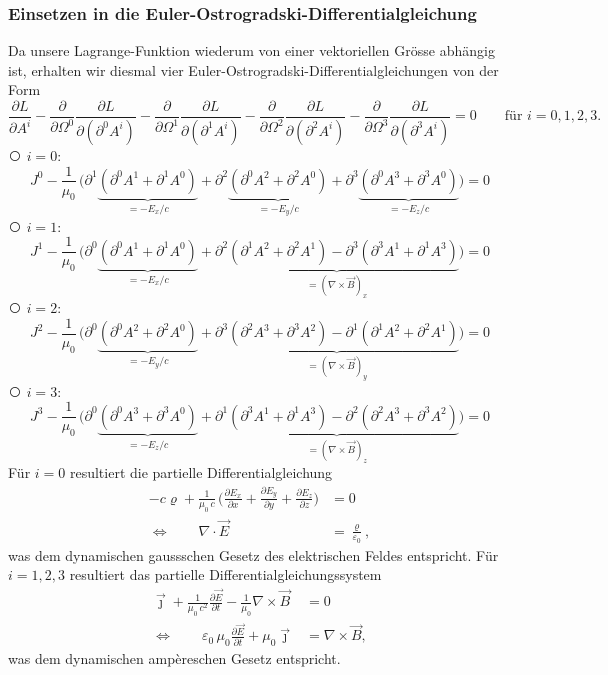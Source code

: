 \subsubsection{Einsetzen in die Euler-Ostrogradski-Differentialgleichung}
Da unsere Lagrange-Funktion wiederum von einer vektoriellen Grösse abhängig ist, erhalten wir diesmal vier Euler-Ostrogradski-Differentialgleichungen von der Form
\[
\frac{\partial L}{\partial A^i} 
- \frac{\partial}{\partial \Omega^0}\frac{\partial L}{\partial(\partial^0 A^i)}
- \frac{\partial}{\partial \Omega^1}\frac{\partial L}{\partial(\partial^1 A^i)}
- \frac{\partial}{\partial \Omega^2}\frac{\partial L}{\partial(\partial^2 A^i)}
- \frac{\partial}{\partial \Omega^3}\frac{\partial L}{\partial(\partial^3 A^i)}
= 0 \qquad \text{für } i=0,1,2,3.
\]
{\larger\textcircled{}} $i = 0$:
\[
J^0  -\frac{1}{\mu_0}\,\biggl(\partial^1\underbrace{\left(\partial^0 A^1 + \partial^1 A^0\right)}_{\displaystyle=-E_x/c}
+ \partial^2\underbrace{\left(\partial^0 A^2 + \partial^2 A^0\right)}_{\displaystyle=-E_y/c}
+ \partial^3\underbrace{\left(\partial^0 A^3 + \partial^3 A^0\right)}_{\displaystyle=-E_z/c}\biggr)
=
0
\]
{\larger\textcircled{}} $i = 1$:
\[
J^1  -\frac{1}{\mu_0}\,\biggl(\partial^0\underbrace{\left(\partial^0 A^1 + \partial^1 A^0\right)}_{\displaystyle=-E_x/c}
+ \underbrace{\partial^2\left(\partial^1 A^2 + \partial^2 A^1\right)
	- \partial^3\left(\partial^3 A^1 + \partial^1 A^3\right)}_{\displaystyle=(\nabla\times\vec{B})_x}\biggr)
=
0
\]
{\larger\textcircled{}} $i = 2$:
\[
J^2  -\frac{1}{\mu_0}\,\biggl(\partial^0\underbrace{\left(\partial^0 A^2 + \partial^2 A^0\right)}_{\displaystyle=-E_y/c}
+ \underbrace{\partial^3\left(\partial^2 A^3 + \partial^3 A^2\right)
	- \partial^1\left(\partial^1 A^2 + \partial^2 A^1\right)}_{\displaystyle=(\nabla\times\vec{B})_y}\biggr)
=
0
\]
{\larger\textcircled{}} $i = 3$:
\[
J^3  -\frac{1}{\mu_0}\,\biggl(\partial^0\underbrace{\left(\partial^0 A^3 + \partial^3 A^0\right)}_{\displaystyle=-E_z/c}
+ \underbrace{\partial^1\left(\partial^3 A^1 + \partial^1 A^3\right)
	- \partial^2\left(\partial^2 A^3 + \partial^3 A^2\right)}_{\displaystyle=(\nabla\times\vec{B})_z}\biggr)
=
0
\]
Für $i=0$ resultiert die partielle Differentialgleichung
\begin{align}
-c\varrho + \frac{1}{\mu_0\,c}\,\biggl(\frac{\partial E_x}{\partial x}
+ \frac{\partial E_y}{\partial y} + \frac{\partial E_z}{\partial z}\biggr)
&=
0\\[1em]
\Leftrightarrow \qquad \nabla\cdot\vec{E}
&=
\frac{\varrho}{\varepsilon_0},
\label{maxwell:section:gauss_dynamisch}
\end{align}
was dem dynamischen gaussschen Gesetz des elektrischen Feldes entspricht.
Für $i=1,2,3$ resultiert das partielle Differentialgleichungssystem
\begin{align}
\vec{\jmath} + \frac{1}{\mu_0\,c^2}\frac{\partial \vec{E}}{\partial t}
- \frac{1}{\mu_0}\nabla\times\vec{B}
&=
0\\[1em]
\Leftrightarrow \qquad \varepsilon_0\,\mu_0\frac{\partial \vec{E}}{\partial t} + \mu_0\vec{\jmath}
&=
\nabla\times\vec{B},
\label{maxwell:section:ampere_dynamisch}
\end{align}
was dem dynamischen ampèreschen Gesetz entspricht.
 
